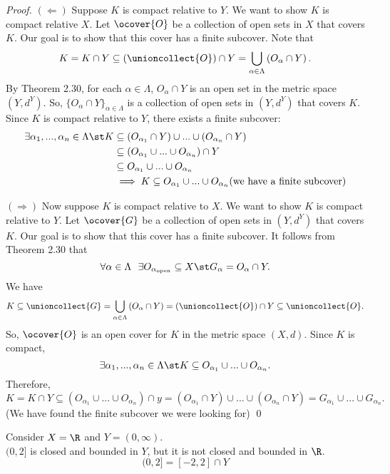 \documentclass[a4paper]{article}
\begin{document}
	\begin{proof}
		$(\Leftarrow)$ Suppose $K$ is compact relative to $Y$. We want to show $K$ is compact relative $X$. Let $\ocover{O}$ be a collection of open sets in $X$ that covers $K$. Our goal is to show that this cover has a finite subcover. Note that
		$$K=K\cap Y \subseteq \left( \unioncollect{O} \right)\cap Y = \bigcup \limits_{\alpha \in \Lambda} \left(O_\alpha \cap Y \right).$$
		By Theorem 2.30, for each $\alpha \in \Lambda$, $O_\alpha \cap Y$ is an open set in the metric space $(Y,d^Y).$ So, $\{O_\alpha \cap Y\}_{\alpha \in \Lambda}$ is a collection of open sets in $(Y,d^Y)$ that covers $K$. Since $K$ is compact relative to $Y$, there exists a finite subcover:
		\begin{align*}
			\exists \alpha_1,...,\alpha_n \in \Lambda \st K &\subseteq (O_{\alpha_1}\cap Y)\cup...\cup(O_{\alpha_n}\cap Y) \\
			&\subseteq(O_{\alpha_1}\cup ... \cup O_{\alpha_n})\cap Y \\
			&\subseteq O_{\alpha_1}\cup ... \cup O_{\alpha_n}\\
			&\implies K \subseteq O_{\alpha_1}\cup ... \cup O_{\alpha_n} \text{(we have a finite subcover)}
		\end{align*}
		
		$(\Rightarrow)$ Now suppose $K$ is compact relative to $X$. We want to show $K$ is compact relative to $Y$. Let $\ocover{G}$ be a collection of open sets in $(Y, d^Y)$ that covers $K$. Our goal is to show that this cover has a finite subcover. It follows from Theorem 2.30 that
		$$\forall \alpha \in \Lambda ~~ \exists O_{\alpha_{\text{open}}} \subseteq X \st G_\alpha = O_\alpha \cap Y.$$
		We have
		$$K \subseteq \unioncollect{G} = \bigcup \limits_{\alpha \in \Lambda} \left(O_\alpha \cap Y\right) = \left(\unioncollect{O}\right) \cap Y \subseteq \unioncollect{O}.$$
		So, $\ocover{O}$ is an open cover for $K$ in the metric space $(X,d)$. Since $K$ is compact, $$\exists \alpha_1,...,\alpha_n \in \Lambda \st K \subseteq O_{\alpha_1}\cup... \cup O_{\alpha_n}.$$
		Therefore, $$K=K\cap Y \subseteq (O_{\alpha_1}\cup ... \cup O_{\alpha_n})\cap y = (O_{\alpha_1}\cap Y)\cup ... \cup (O_{\alpha_n}\cap Y) = G_{\alpha_1}\cup...\cup G_{\alpha_n}.$$
		(We have found the finite subcover we were looking for) \qed
	\end{proof}
	
	Consider $X=\R$ and $Y=(0,\infty).$ \\
	$(0, 2]$ is closed and bounded in $Y$, but it is not closed and bounded in $\R$.
	$$(0,2]=[-2,2]\cap Y$$
	
\end{document}
